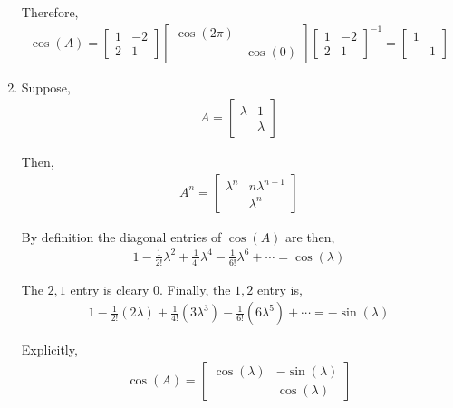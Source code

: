 \documentclass[10pt]{article}
\begin{document}
\begin{solution}[Solution]
\begin{enumerate}[label=(\alph*)]
        Therefore,
        \begin{align*}
            \cos(A) =
            \left[\begin{array}{rr}1 & -2 \\ 2 & 1\end{array}\right]
                \left[\begin{array}{rr}\cos(2\pi) \\ & \cos(0)\end{array}\right]
                \left[\begin{array}{rr}1 & -2 \\ 2 & 1\end{array}\right]^{-1}
                    = \left[\begin{array}{rr}1 \\ & 1\end{array}\right]
        \end{align*}

    \item Suppose,
        \begin{align*}
            A = \left[\begin{array}{rr} \lambda & 1 \\ & \lambda\end{array}\right]
        \end{align*}

        Then,
        \begin{align*}
            A^n = \left[\begin{array}{rr} \lambda^n & n \lambda^{n-1} \\ & \lambda^n \end{array}\right]
        \end{align*}
        
        By definition the diagonal entries of \( \cos(A) \) are then,
        \begin{align*}
            1 - \frac{1}{2!} \lambda^2 + \frac{1}{4!}\lambda^4 - \frac{1}{6!} \lambda^6 + \cdots = \cos(\lambda)
        \end{align*}
        
        The \( 2,1 \) entry is cleary 0. Finally, the \( 1,2 \) entry is,
        \begin{align*}
            1 - \frac{1}{2!}(2 \lambda) + \frac{1}{4!} (3 \lambda^3) - \frac{1}{6!} (6 \lambda^5) + \cdots
            = - \sin(\lambda) 
        \end{align*}
        
        Explicitly,
        \begin{align*}
            \cos(A) = \left[\begin{array}{rr}\cos(\lambda) & -\sin(\lambda) \\ & \cos(\lambda)\end{array}\right]
        \end{align*}

\end{enumerate}

\end{solution}
\end{document}

